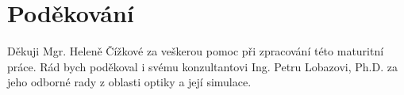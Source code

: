 \chapter*{Poděkování}

Děkuji Mgr. Heleně Čížkové za veškerou pomoc při zpracování této maturitní práce. Rád bych poděkoval i svému konzultantovi Ing. Petru Lobazovi, Ph.D. za jeho odborné rady z oblasti optiky a její simulace.
